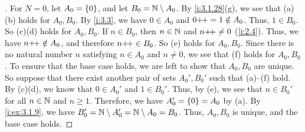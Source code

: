 \begin{proof}[]
  For \(N = 0\), let \(A_0 = \left\lbrace0\right\rbrace\), and let \(B_0 = \mathbb{N} \setminus A_0\).
  By \cref{i:3.1.28}(g), we see that (a)(b) holds for \(A_0, B_0\).
  By \cref{i:3.3}, we have \(0 \in A_0\) and \(0{+}\!{+} = 1 \notin A_0\).
  Thus, \(1 \in B_0\).
  So (c)(d) holds for \(A_0, B_0\).
  If \(n \in B_0\), then \(n \in \mathbb{N}\) and \(n{+}\!{+} \neq 0\) (\cref{i:2.4}).
  Thus, we have \(n{+}\!{+} \notin A_0\), and therefore \(n{+}\!{+} \in B_0\).
  So (e) holds for \(A_0, B_0\).
  Since there is no natural number \(n\) satisfying \(n \in A_0\) and \(n \neq 0\), we see that (f) holds for \(A_0, B_0\).
  To ensure that the base case holds, we are left to show that \(A_0, B_0\) are unique.
  So suppose that there exist another pair of sets \(A_0', B_0'\) such that (a)--(f) hold.
  By (c)(d), we know that \(0 \in A_0'\) and \(1 \in B_0'\).
  Thus, by (e), we see that \(n \in B_0'\) for all \(n \in \mathbb{N}\) and \(n \geq 1\).
  Therefore, we have \(A_0' = \left\lbrace0\right\rbrace = A_0\) by (a).
  By \cref{i:ex:3.1.9}, we have \(B_0' = \mathbb{N} \setminus A_0' = \mathbb{N} \setminus A_0 = B_0\).
  Thus, \(A_0, B_0\) is unique, and the base case holds.


\end{proof}
